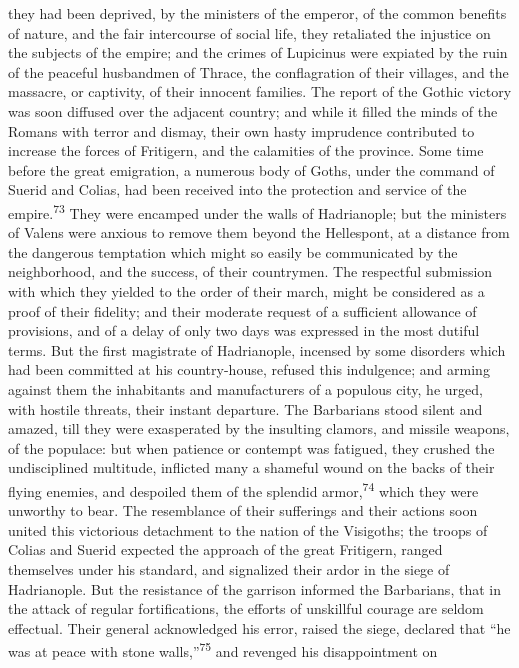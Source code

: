 they had been deprived, by the ministers of the emperor, of the
common benefits of nature, and the fair intercourse of social
life, they retaliated the injustice on the subjects of the
empire; and the crimes of Lupicinus were expiated by the ruin of
the peaceful husbandmen of Thrace, the conflagration of their
villages, and the massacre, or captivity, of their innocent
families. The report of the Gothic victory was soon diffused over
the adjacent country; and while it filled the minds of the Romans
with terror and dismay, their own hasty imprudence contributed to
increase the forces of Fritigern, and the calamities of the
province. Some time before the great emigration, a numerous body
of Goths, under the command of Suerid and Colias, had been
received into the protection and service of the empire.\textsuperscript{73} They
were encamped under the walls of Hadrianople; but the ministers
of Valens were anxious to remove them beyond the Hellespont, at a
distance from the dangerous temptation which might so easily be
communicated by the neighborhood, and the success, of their
countrymen. The respectful submission with which they yielded to
the order of their march, might be considered as a proof of their
fidelity; and their moderate request of a sufficient allowance of
provisions, and of a delay of only two days was expressed in the
most dutiful terms. But the first magistrate of Hadrianople,
incensed by some disorders which had been committed at his
country-house, refused this indulgence; and arming against them
the inhabitants and manufacturers of a populous city, he urged,
with hostile threats, their instant departure. The Barbarians
stood silent and amazed, till they were exasperated by the
insulting clamors, and missile weapons, of the populace: but when
patience or contempt was fatigued, they crushed the undisciplined
multitude, inflicted many a shameful wound on the backs of their
flying enemies, and despoiled them of the splendid armor,\textsuperscript{74}
which they were unworthy to bear. The resemblance of their
sufferings and their actions soon united this victorious
detachment to the nation of the Visigoths; the troops of Colias
and Suerid expected the approach of the great Fritigern, ranged
themselves under his standard, and signalized their ardor in the
siege of Hadrianople. But the resistance of the garrison informed
the Barbarians, that in the attack of regular fortifications, the
efforts of unskillful courage are seldom effectual. Their general
acknowledged his error, raised the siege, declared that “he was
at peace with stone walls,”\textsuperscript{75} and revenged his disappointment on
